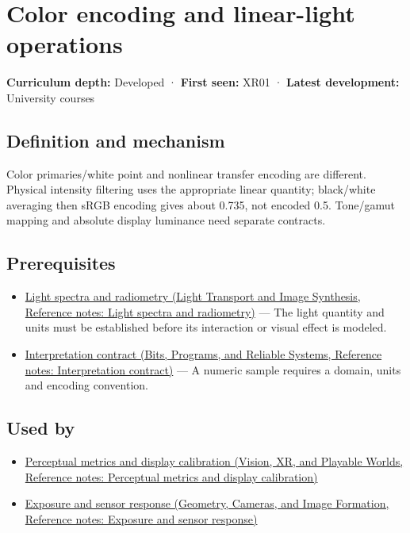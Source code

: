 \hypertarget{appendix-a9f83ad40792}{}\label{referencestart:appendix-a9f83ad40792}
\section{Color encoding and linear-light operations}\label{appendix-a9f83ad40792-color-encoding-and-linear-light-operations}

\textbf{Curriculum depth:} Developed · \textbf{First seen:} XR01 · \textbf{Latest development:} University courses

\subsection{Definition and mechanism}\label{appendix-a9f83ad40792-definition-and-mechanism}

Color primaries/white point and nonlinear transfer encoding are different. Physical intensity filtering uses the appropriate linear quantity; black/white averaging then sRGB encoding gives about 0.735, not encoded 0.5. Tone/gamut mapping and absolute display luminance need separate contracts.

\subsection{Prerequisites}\label{appendix-a9f83ad40792-prerequisites}

\begin{itemize}
\tightlist
\item
  \href{../04-Light-Transport-and-Image-Synthesis/main.pdf\#nameddest=appendix-215c2570199b}{Light spectra and radiometry (Light Transport and Image Synthesis, Reference notes: Light spectra and radiometry)} --- The light quantity and units must be established before its interaction or visual effect is modeled.
\item
  \href{../01-Bits-Programs-and-Reliable-Systems/main.pdf\#nameddest=appendix-f414bd4ed05c}{Interpretation contract (Bits, Programs, and Reliable Systems, Reference notes: Interpretation contract)} --- A numeric sample requires a domain, units and encoding convention.
\end{itemize}

\subsection{Used by}\label{appendix-a9f83ad40792-used-by}

\begin{itemize}
\tightlist
\item
  \href{../07-Vision-XR-and-Playable-Worlds/main.pdf\#nameddest=appendix-b2c1846508bf}{Perceptual metrics and display calibration (Vision, XR, and Playable Worlds, Reference notes: Perceptual metrics and display calibration)}
\item
  \href{../03-Geometry-Cameras-and-Image-Formation/main.pdf\#nameddest=appendix-92d45cdf2afc}{Exposure and sensor response (Geometry, Cameras, and Image Formation, Reference notes: Exposure and sensor response)}
\end{itemize}


